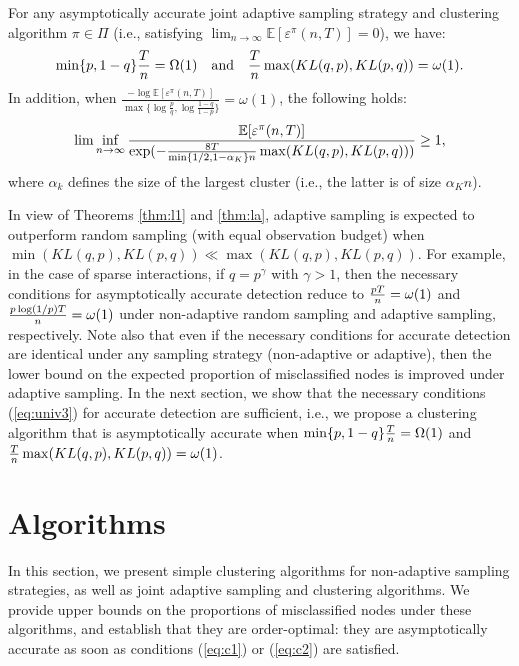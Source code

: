 \documentclass[12pt]{colt}%
\begin{document}
\begin{theorem}\label{thm:la}
For any asymptotically accurate joint adaptive sampling strategy and clustering algorithm $\pi\in\Pi$ (i.e., satisfying $\lim_{n\to\infty} \mathbb{E}[\varepsilon^\pi(n,T)]=0$), we have: 
\begin{equation}\label{eq:univ3}
\min\{p,1-q\}{T\over n}=\Omega(1)  \quad\hbox{and}\quad {T\over n}\max(KL(q,p),KL(p,q))=\omega(1).
\end{equation}
In addition, when $\frac{-\log \mathbb{E}[\varepsilon^\pi(n,T)]}{ \max\{\log \frac{p}{q},\log \frac{1-q}{1-p}\} } = \omega(1)$, the following holds:
\begin{equation}\label{eq:univ4}
 \lim\inf_{n\to\infty} {\mathbb{E}[\varepsilon^\pi(n,T)]\over \exp(-{8T\over \min\{1/2, 1-\alpha_K\} n}\max(KL(q,p),KL(p,q)))}\ge 1,
\end{equation}
where $\alpha_k$ defines the size of the largest cluster (i.e., the latter is of size $\alpha_K n$).
\end{theorem}

In view of Theorems \ref{thm:l1} and \ref{thm:la}, adaptive sampling is expected to outperform random sampling (with equal observation budget) when $\min(KL(q,p),KL(p,q))\ll \max(KL(q,p),KL(p,q))$. For example, in the case of sparse interactions, if $q=p^\gamma$ with $\gamma>1$, then the necessary conditions for asymptotically accurate detection reduce to ${pT\over n}=\omega(1)$ and ${p\log(1/p)T\over n}=\omega(1)$ under non-adaptive random sampling and adaptive sampling, respectively. Note also that even if the necessary conditions for accurate detection are identical under any sampling strategy (non-adaptive or adaptive), then the lower bound on the expected proportion of misclassified nodes is improved under adaptive sampling. In the next section, we show that the necessary conditions (\ref{eq:univ3}) for accurate detection are sufficient, i.e., we propose a clustering algorithm that is asymptotically accurate when $\min\{p,1-q \}{T\over n}=\Omega(1)$ and ${T\over n}\max(KL(q,p),KL(p,q))=\omega(1)$. 

\section{Algorithms}

In this section, we present simple clustering algorithms for non-adaptive sampling strategies, as well as joint adaptive sampling and clustering algorithms. We provide upper bounds on the proportions of misclassified nodes under these algorithms, and establish that they are order-optimal: they are asymptotically accurate as soon as conditions (\ref{eq:c1}) or (\ref{eq:c2}) are satisfied.
\end{document}

